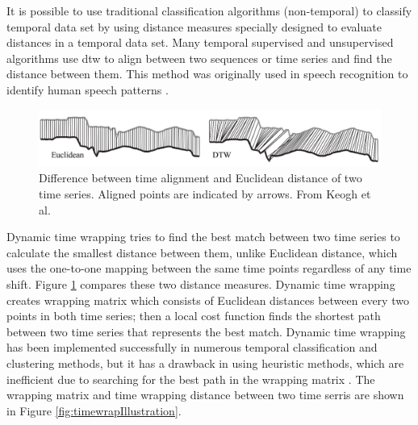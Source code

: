 It is possible to use traditional classification algorithms (non-temporal) to classify temporal data set by using distance measures specially designed to evaluate distances in a temporal data set. Many temporal supervised and unsupervised algorithms use \acrfull{dtw} \cite{Berndt1994} to align between two sequences or time series and find the distance between them. This method was originally used in speech recognition to identify human speech patterns \cite{rabiner1993fundamentals}. 
 

\begin{figure}[!h]
    \centering
    \includegraphics[width=1\textwidth]{images/chapter2/DWtvsEuclidean.png}
    \caption{Difference between time alignment and Euclidean distance of two time series. Aligned points are indicated by arrows. From Keogh et al. \cite{Keogh2005}}
    \label{fig:DWtvsEuclidean}
\end{figure}


Dynamic time wrapping tries to find the best match between two time series to calculate the smallest distance between them, unlike Euclidean distance, which uses the one-to-one mapping between the same time points regardless of any time shift. Figure \ref{fig:DWtvsEuclidean} compares these two distance measures. Dynamic time wrapping creates wrapping matrix which consists of Euclidean distances between every two points in both time series; then a local cost function finds the shortest path between two time series that represents the best match. Dynamic time wrapping has been implemented successfully in numerous temporal classification and clustering methods, but it has a drawback in using heuristic methods, which are inefficient due to searching for the best path in the wrapping matrix \cite{Keogh2005}. The wrapping matrix and time wrapping distance between two time serris are shown in Figure \ref{fig:timewrapIllustration}.

